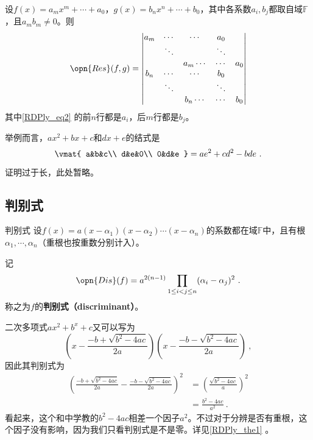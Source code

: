 \begin{theorem}{}\label{RDPly_the2}
设$f(x)=a_mx^m+\cdots+a_0$，$g(x)=b_nx^n+\cdots+b_0$，其中各系数$a_i, b_j$都取自域$\mathbb{F}$，且$a_mb_m\neq 0$。则
\begin{equation}\label{RDPly_eq2}
\opn{Res}(f, g)=
\begin{vmatrix}
a_m&\cdots&\cdots&a_0\\
&\ddots& & \ddots\\
&&a_m\cdots&\cdots&a_0\\
b_n&\cdots&\cdots&b_0\\
&\ddots& & \ddots\\
&&b_n\cdots&\cdots&b_0\\
\end{vmatrix}
\end{equation}
其中\autoref{RDPly_eq2} 的前$n$行都是$a_i$，后$m$行都是$b_j$。

举例而言，$ax^2+bx+c$和$dx+e$的结式是
\begin{equation}
\vmat{
    a&b&c\\
    d&e&0\\
    0&d&e
}
=
ae^2+cd^2-bde~.
\end{equation}

\end{theorem}

证明过于长，此处暂略。



\subsection{判别式}

\begin{definition}{判别式}\label{RDPly_def1}
设$f(x)=a(x-\alpha_1)(x-\alpha_2)\cdots(x-\alpha_n)$的系数都在域$\mathbb{F}$中，且有根$\alpha_1, \cdots, \alpha_n$（重根也按重数分别计入）。

记
\begin{equation}\label{RDPly_eq3}
\opn{Dis}(f) = a^{2(n-1)}\prod_{1\leq i<j\leq n}(\alpha_i-\alpha_j)^2~.
\end{equation}
称之为$f$的\textbf{判别式（discriminant）}。
\end{definition}

\begin{example}{}
二次多项式$ax^2+b^x+c$又可以写为
\begin{equation}
(x-\frac{-b+\sqrt{b^2-4ac}}{2a})(x-\frac{-b-\sqrt{b^2-4ac}}{2a})~,
\end{equation}
因此其判别式为
\begin{equation}
\begin{aligned}
(\frac{-b+\sqrt{b^2-4ac}}{2a}-\frac{-b-\sqrt{b^2-4ac}}{2a})^2 &= (\frac{\sqrt{b^2-4ac}}{a})^2\\
&=\frac{b^2-4ac}{a^2}~.
\end{aligned}
\end{equation}
看起来，这个和中学教的$b^2-4ac$相差一个因子$a^2$。不过对于分辨是否有重根，这个因子没有影响，因为我们只看判别式是不是零。详见\autoref{RDPly_the1} 。
\end{example}



